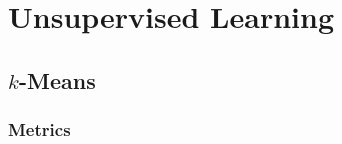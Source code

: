 \section{Unsupervised Learning}
\label{ml:unsupervised}

\subsection{\texorpdfstring{$k$}{k}-Means}
\label{ml:unsupervised:kMean}

\subsubsection{Metrics}
\label{ml:unsupervised:kMean:metrics}

